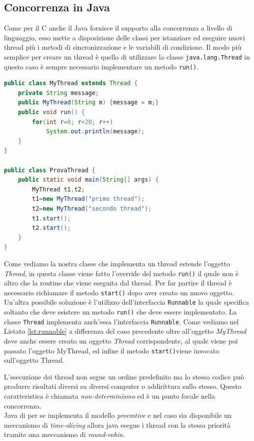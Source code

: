 \subsection{Concorrenza in Java}
Come per il C anche il Java fornisce il supporto alla concorrenza a livello di linguaggio, esso mette a disposizione delle classi per istanziare ed eseguire nuovi thread più i metodi di sincronizzazione e le variabili di condizione.
Il modo più semplice per creare un thread è quello di utilizzare la classe \texttt{java.lang.Thread} in questo caso è sempre necessario implementare un metodo \texttt{run()}.
\begin{lstlisting}[language=Java,caption={Uso della classe Thread in Java},label=lst:jthread]
public class MyThread extends Thread {
	private String message;
	public MyThread(String m) {message = m;}
	public void run() {
		for(int r=0; r<20; r++)
			System.out.println(message);
	}
}

public class ProvaThread {
	public static void main(String[] args) {
		MyThread t1,t2;
		t1=new MyThread("primo thread");
		t2=new MyThread("secondo thread");
		t1.start();
		t2.start();
	}
}
\end{lstlisting}
Come vediamo la nostra classe che implementa un thread estende l'oggetto \emph{Thread}, in questa classe viene fatto l'override del metodo \texttt{run()} il quale non è altro che la routine che viene eseguita dal thread. Per far partire il thread è necessario richiamare il metodo \texttt{start()} dopo aver creato un nuovo oggetto.\\
Un'altra possibile soluzione è l'utilizzo dell'interfaccia \texttt{Runnable} la quale specifica soltanto che deve esistere un metodo \texttt{run()} che deve essere implementato. La classe \texttt{Thread} implementa anch'essa l'interfaccia \texttt{Runnable}.
Come vediamo nel  Listato \ref{lst:runnable} a differenza del caso precedente oltre all'oggetto \emph{MyThread} deve anche essere creato un oggetto \emph{Thread} corrispondente, al quale viene poi passato l'oggetto MyThread, ed infine il metodo \texttt{start()}viene invocato sull'oggetto Thread.

L'esecuzione dei thread non segue un ordine predefinito ma lo stesso codice può produrre risultati diversi su diversi computer o addirittura sullo stesso. Questo caratteristica è chiamata \emph{non-determinismo} ed è un punto focale nella concorrenza.\\
Java di per se implementa il modello \emph{preemtive} e nel caso sia disponibile un meccanismo di \emph{time-slicing} allora java esegue i thread con la stessa priorità tramite una meccanismo di \emph{round-robin}.\\

